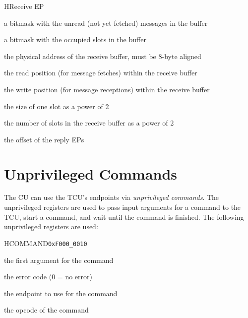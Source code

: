 \documentclass[a4paper,11pt]{article}
\begin{document}
\begin{register}{H}{Receive EP}{}
  \regnewline%
  \regnewline%
  \regnewline%
  \begin{regdesc}\begin{reglist}
    \item[unread] a bitmask with the unread (not yet fetched) messages in the buffer
    \item[occupied] a bitmask with the occupied slots in the buffer
    \item[buffer] the physical address of the receive buffer, must be 8-byte aligned
    \item[rpos] the read position (for message fetches) within the receive buffer
    \item[wpos] the write position (for message receptions) within the receive buffer
    \item[slot\_size] the size of one slot as a power of 2
    \item[slots] the number of slots in the receive buffer as a power of 2
    \item[rpl\_eps] the offset of the reply EPs
  \end{reglist}\end{regdesc}
\end{register}

\section{Unprivileged Commands}

The CU can use the TCU's endpoints via \emph{unprivileged commands}. The unprivileged registers are
used to pass input arguments for a command to the TCU, start a command, and wait until the command
is finished. The following unprivileged registers are used:

\begin{register}{H}{COMMAND}{\texttt{0xF000\_0010}}
  \regnewline%
  \begin{regdesc}\begin{reglist}
    \item[arg0] the first argument for the command
    \item[error] the error code (0 = no error)
    \item[ep] the endpoint to use for the command
    \item[op] the opcode of the command
  \end{reglist}\end{regdesc}
\end{register}
\end{document}
